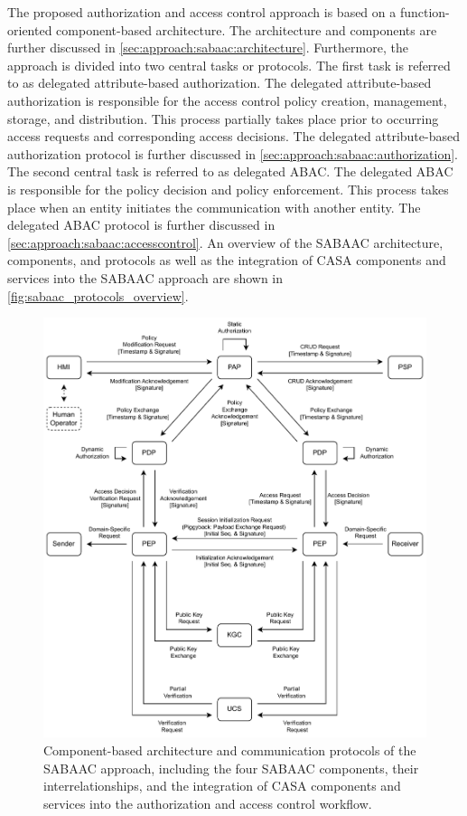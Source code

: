 The proposed authorization and access control approach is based on a function-oriented component-based architecture.
The architecture and components are further discussed in \autoref{sec:approach:sabaac:architecture}.
Furthermore, the approach is divided into two central tasks or protocols.
The first task is referred to as delegated attribute-based authorization.
The delegated attribute-based authorization is responsible for the access control policy creation, management, storage, and distribution.
This process partially takes place prior to occurring access requests and corresponding access decisions.
The delegated attribute-based authorization protocol is further discussed in \autoref{sec:approach:sabaac:authorization}.
The second central task is referred to as delegated ABAC.
The delegated ABAC is responsible for the policy decision and policy enforcement.
This process takes place when an entity initiates the communication with another entity.
The delegated ABAC protocol is further discussed in \autoref{sec:approach:sabaac:accesscontrol}.
An overview of the SABAAC architecture, components, and protocols as well as the integration of CASA components and services into the SABAAC approach are shown in \autoref{fig:sabaac_protocols_overview}.
\begin{figure}
	\centering
    \includegraphics[width=1.0\linewidth]{figures/SABAAC_protocols_overview.drawio.pdf}
	\caption{Component-based architecture and communication protocols of the SABAAC approach, including the four SABAAC components, their interrelationships, and the integration of CASA components and services into the authorization and access control workflow.}
	\label{fig:sabaac_protocols_overview}
\end{figure}

